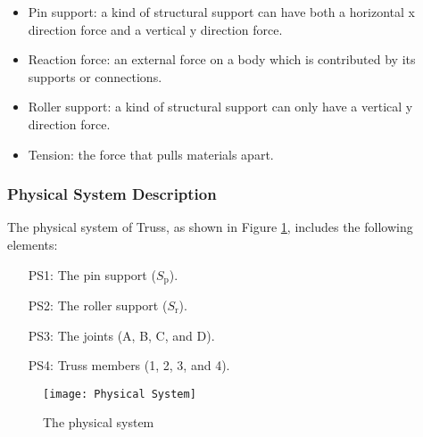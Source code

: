\documentclass[12pt]{article}
\begin{document}
\begin{itemize}

\item Pin support: a kind of structural support can have both a horizontal x 
direction force and a vertical y direction force.

\end{itemize}

\begin{itemize}
	
	\item Reaction force: an external force on a body which is contributed by 
	its supports or connections.
	
\end{itemize}

\begin{itemize}
	
	\item Roller support: a kind of structural support can only have a 
	vertical y direction force.
	
\end{itemize}

\begin{itemize}
	
	\item Tension: the force that pulls materials apart.
	
\end{itemize}

\subsubsection{Physical System Description} \label{sec_phySystDescrip}

The physical system of Truss, as shown in Figure \ref{Fig_PhysicalSystem},
includes the following elements:

\begin{itemize}

\item[PS1:] The pin support ($S_\text{p}$).

\item[PS2:] The roller support ($S_\text{r}$).

\item[PS3:] The joints (A, B, C, and D).

\item[PS4:] Truss members (1, 2, 3, and 4).

\end{itemize}


\begin{figure}[h!]
	\begin{center}
		\texttt{[image: Physical System]}
		\caption{The physical system}
		\label{Fig_PhysicalSystem} 
	\end{center}
\end{figure}
\end{document}
